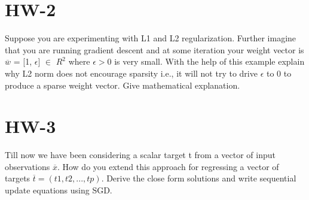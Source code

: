 \documentclass{article}
\begin{document}
\section*{\hfil HW-2}
Suppose you are experimenting with L1 and L2 regularization. Further imagine that you are running gradient descent and at some iteration your weight vector is $\overline{w}$ = [1, $\epsilon$] $\in$ $R^2$ where $\epsilon > 0$ is very small. With the help of this example explain why L2 norm does not encourage sparsity i.e., it will not try to drive $\epsilon$ to 0 to produce a sparse weight vector. Give mathematical explanation.

\section*{\hfil HW-3}
Till now we have been considering a scalar target t from a vector of input observations $\overline{x}$. How do you extend this approach for regressing a vector of targets $\overline{t} = (t1, t2, ..., tp)$. Derive the close form solutions and write sequential update equations using SGD.
\end{document}
